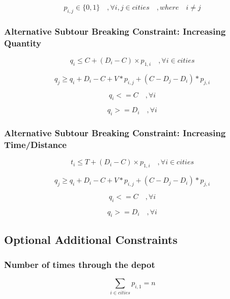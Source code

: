 \documentclass[a4paper,11pt]{article}
\begin{document}
\begin{equation}\label{eq4}
p_{i,j} \in{\{0,1\}} \quad , \forall i,j \in cities\quad, where \quad i \neq j
\end{equation}

\subsubsection{Alternative Subtour Breaking Constraint: Increasing Quantity }
\begin{equation}\label{Q}
q_{i} \leq C + (D_{i} - C) \times  p _{1,i} \quad, \forall i \in cities
\end{equation}

\begin{equation}\label{incQ}
q_{j} \geq q_{i} + D_{i} - C + V*p_{i,j}  + (C-D_{j}-D_{i})*p_{j,i}
\end{equation}

\begin{equation}
q_{i} <= C \quad, \forall i
\end{equation}

\begin{equation}
q_{i} >= D_{i} \quad, \forall i
\end{equation}


\subsubsection{Alternative Subtour Breaking Constraint: Increasing Time/Distance}
\begin{equation}\label{T}
t_{i} \leq T + (D_{i} - C) \times  p _{1,i} \quad, \forall i \in cities
\end{equation}

\begin{equation}\label{incT}
q_{j} \geq q_{i} + D_{i} - C + V*p_{i,j}  + (C-D_{j}-D_{i})*p_{j,i}
\end{equation}

\begin{equation}
q_{i} <= C \quad, \forall i
\end{equation}

\begin{equation}
q_{i} >= D_{i} \quad, \forall i
\end{equation}


\subsection{Optional Additional Constraints}
\subsubsection{Number of times through the depot}
\begin{equation}\label{eq2}
\sum\limits_{i \in cities} p_{i,1} = n
\end{equation}
\end{document}

